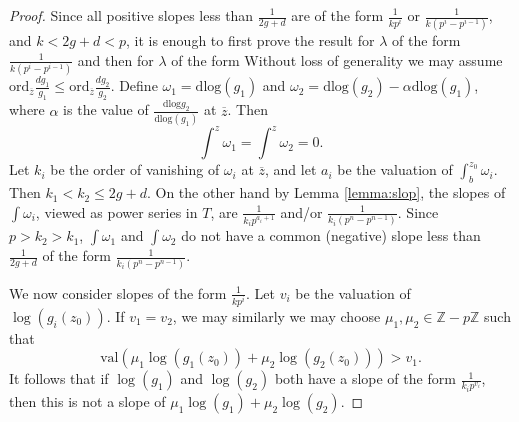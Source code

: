\documentclass[10pt,a4paper]{amsart}
\def\Z{\mathbb Z}
\newcommand{\dlog}{\mathrm{dlog}}
\newcommand{\ord}{\mathrm{ord}}
\newcommand{\val}{\mathrm{val}}
\begin{document}
\begin{proof}
Since all positive slopes less than $\frac{1}{2g+d}$ are of the form $\frac{1}{kp^i}$ or $\frac{1}{k(p^i -p^{i-1})}$, and $k<2g+d<p$, it is enough to first prove the result for $\lambda $ of the form $\frac{1}{k(p^i-p^{i-1})}$ and then for $\lambda $ of the form
Without loss of generality we may assume $\ord _{\overline{z}}\frac{dg_1 }{g_1 }\leq \ord _{\overline{z}}\frac{dg_2 }{g_2 }$. Define $\omega _1 =\dlog (g_1 )$ and $\omega _2 =\dlog (g_2 )-\alpha \dlog (g_1 )$, where $\alpha$ is the value of $\frac{\dlog g_2 }{\dlog (g_1 )}$ at $\overline{z}$. Then 
\[
\int ^z \omega _1 =\int ^z \omega _2 =0.
\]
Let $k_i $ be the order of vanishing of $\omega _i$ at $\overline{z}$, and let $a_i$ be the valuation of $\int ^{z_0 }_b \omega _i $. Then $k_1 <k_2 \leq 2g+d$. On the other hand by Lemma \ref{lemma:slop}, the slopes of $\int \omega _i $, viewed as power series in $T$, are $\frac{1}{k_i p^{a_i +1}}$ and/or $\frac{1}{k_i (p^n-p^{n-1})}$. Since $p>k_2 >k_1 $, $\int \omega _1 $ and $\int \omega _2 $ do not have a common (negative) slope less than $\frac{1}{2g+d}$ of the form $\frac{1}{k_i (p^n-p^{n-1})}$. 

We now consider slopes of the form $\frac{1}{kp^i}$. Let $v_i$ be the valuation of $\log (g_i (z_0 ))$. If $v_1 =v_2$, we may similarly we may choose $\mu _1 ,\mu _2 \in \Z -p\Z $ such that 
\[
\val (\mu _1 \log (g_1 (z_0 ))+\mu _2 \log (g_2 (z_0 )))>v_1 .
\]
It follows that if $\log (g_1 )$ and $\log (g_2 )$ both have a slope of the form $\frac{1}{k_i p^{v_i }}$, then this is not a slope of $\mu _1 \log (g_1 )+\mu _2 \log (g_2 )$.
\end{proof}
\end{document}

